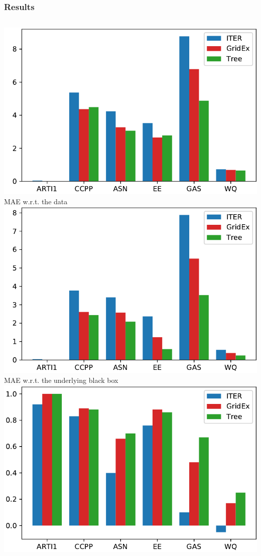 \documentclass[presentation]{beamer}
\begin{document}
\begin{frame}%
	\frametitle{Results}
	\scriptsize
	\begin{columns}[t]
			\centering
			\includegraphics[width=.8\columnwidth]{img/comp/mae.pdf}\\
			MAE w.r.t. the data\vspace{10px}
			\includegraphics[width=.8\columnwidth]{img/comp/maefid.pdf}\\
			MAE w.r.t. the underlying black box
			\centering
			\includegraphics[width=.8\columnwidth]{img/comp/r2.pdf}\\

\end{columns}
\end{frame}
\end{document}

